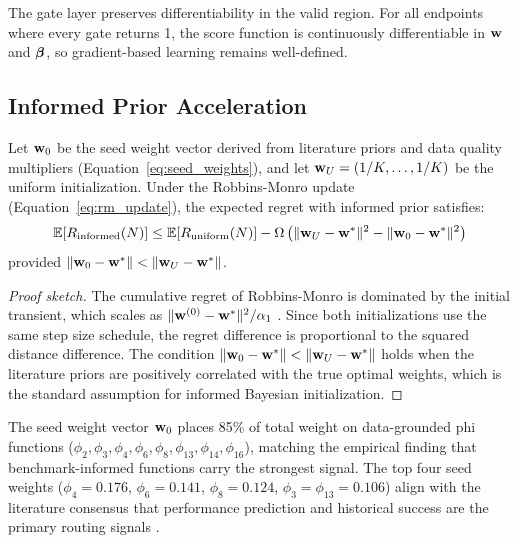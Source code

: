 \begin{remark}
The gate layer preserves differentiability in the valid region. For all endpoints where every gate returns 1, the score function is continuously differentiable in $\mathbf{w}$ and $\boldsymbol{\beta}$, so gradient-based learning remains well-defined.
\end{remark}

\subsection{Informed Prior Acceleration}

\begin{proposition}
\label{prop:prior}
Let $\mathbf{w}_0$ be the seed weight vector derived from literature priors and data quality multipliers (Equation~\ref{eq:seed_weights}), and let $\mathbf{w}_U = (1/K, \ldots, 1/K)$ be the uniform initialization. Under the Robbins-Monro update (Equation~\ref{eq:rm_update}), the expected regret with informed prior satisfies:
\begin{equation}
\mathbb{E}[R_{\text{informed}}(N)] \leq \mathbb{E}[R_{\text{uniform}}(N)] - \Omega\left(\|\mathbf{w}_U - \mathbf{w}^*\|^2 - \|\mathbf{w}_0 - \mathbf{w}^*\|^2\right)
\end{equation}
provided $\|\mathbf{w}_0 - \mathbf{w}^*\| < \|\mathbf{w}_U - \mathbf{w}^*\|$.
\end{proposition}

\begin{proof}[Proof sketch]
The cumulative regret of Robbins-Monro is dominated by the initial transient, which scales as $\|\mathbf{w}^{(0)} - \mathbf{w}^*\|^2 / \alpha_1$ \citep{auer2002finite}. Since both initializations use the same step size schedule, the regret difference is proportional to the squared distance difference. The condition $\|\mathbf{w}_0 - \mathbf{w}^*\| < \|\mathbf{w}_U - \mathbf{w}^*\|$ holds when the literature priors are positively correlated with the true optimal weights, which is the standard assumption for informed Bayesian initialization.
\end{proof}

The seed weight vector $\mathbf{w}_0$ places 85\% of total weight on data-grounded phi functions ($\phi_2, \phi_3, \phi_4, \phi_6, \phi_8, \phi_{13}, \phi_{14}, \phi_{16}$), matching the empirical finding that benchmark-informed functions carry the strongest signal. The top four seed weights ($\phi_4 = 0.176$, $\phi_6 = 0.141$, $\phi_8 = 0.124$, $\phi_3 = \phi_{13} = 0.106$) align with the literature consensus that performance prediction and historical success are the primary routing signals \citep{chen2023frugalgpt, ong2024routellm}.

